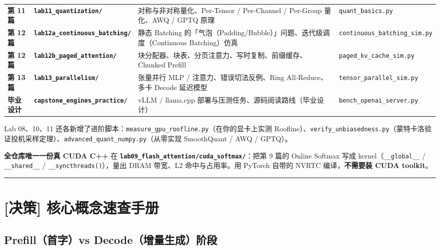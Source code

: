 \begin{center}
\begin{tabularx}{\textwidth}{p{2.5cm} p{3.5cm} X X}
\textbf{第 11 篇} & {}\textbf{\texttt{lab11\_quantization/}} & 对称与非对称量化、Per-Tensor / Per-Channel / Per-Group 量化、AWQ / GPTQ 原理 & \texttt{quant\_basics.py} \\
\textbf{第 12 篇} & {}\textbf{\texttt{lab12a\_continuous\_batching/}} & 静态 Batching 的「气泡（Padding/Bubble）」问题、迭代级调度（Continuous Batching）仿真 & \texttt{continuous\_batching\_sim.py} \\
\textbf{第 12 篇} & {}\textbf{\texttt{lab12b\_paged\_attention/}} & 块分配器、块表、分页注意力、写时复制、前缀缓存、Chunked Prefill & \texttt{paged\_kv\_cache\_sim.py} \\
\textbf{第 13 篇} & {}\textbf{\texttt{lab13\_parallelism/}} & 张量并行 MLP / 注意力、错误切法反例、Ring All-Reduce、多卡 Decode 延迟模型 & \texttt{tensor\_parallel\_sim.py} \\
\textbf{毕业设计} & {}\textbf{\texttt{capstone\_engines\_practice/}} & vLLM / llama.cpp 部署与压测任务、源码阅读路线（毕业设计） & \texttt{bench\_openai\_server.py} \\
\bottomrule
\end{tabularx}
\end{center}

Lab 08、10、11 还各新增了进阶脚本：\texttt{measure\_gpu\_roofline.py}（在你的显卡上实测 Roofline）、\texttt{verify\_unbiasedness.py}（蒙特卡洛验证投机采样定理）、\texttt{advanced\_quant\_numpy.py}（从零实现 SmoothQuant / AWQ / GPTQ）。

\textbf{全仓库唯一一份真 CUDA C++} 在 \textbf{\texttt{lab09\_flash\_attention/cuda\_softmax/}}：把第 9 篇的 Online Softmax 写成 kernel（\texttt{\_\_global\_\_} / \texttt{\_\_shared\_\_} / \texttt{\_\_syncthreads()}），量出 DRAM 带宽、L2 命中与占用率。用 PyTorch 自带的 NVRTC 编译，\textbf{不需要装 CUDA toolkit}。

\vspace{0.8em}\hrule\vspace{0.8em}

\section{[决策] 核心概念速查手册}

\subsection{Prefill（首字）vs Decode（增量生成）阶段}

